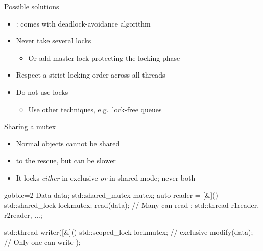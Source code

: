 \begin{frame}[fragile]
  \begin{block}{Possible solutions}
    \begin{itemize}
    \item {}:  comes with deadlock-avoidance algorithm
    \item Never take several locks
      \begin{itemize}
      \item Or add master lock protecting the locking phase
      \end{itemize}
    \item Respect a strict locking order across all threads
    \item Do not use locks
      \begin{itemize}
      \item Use other techniques, e.g.\ lock-free queues
      \end{itemize}
    \end{itemize}
  \end{block}
\end{frame}

\begin{frame}[fragile]
  \begin{block}{Sharing a mutex}
    \begin{itemize}
      \item Normal  objects cannot be shared
      \item {} to the rescue, but can be slower
      \item It locks \emph{either} in exclusive \emph{or} in shared mode; never both
    \end{itemize}
  \end{block}
  \begin{exampleblock}{}
    \begin{cppcode*}{gobble=2}
      Data data; std::shared_mutex mutex;
      auto reader = [&](){
        std::shared_lock lock{mutex};
        read(data); // Many can read
      };
      std::thread r1{reader}, r2{reader}, ...;

      std::thread writer([&](){
        std::scoped_lock lock{mutex}; // exclusive
        modify(data); // Only one can write
      });
    \end{cppcode*}
  \end{exampleblock}
\end{frame}

